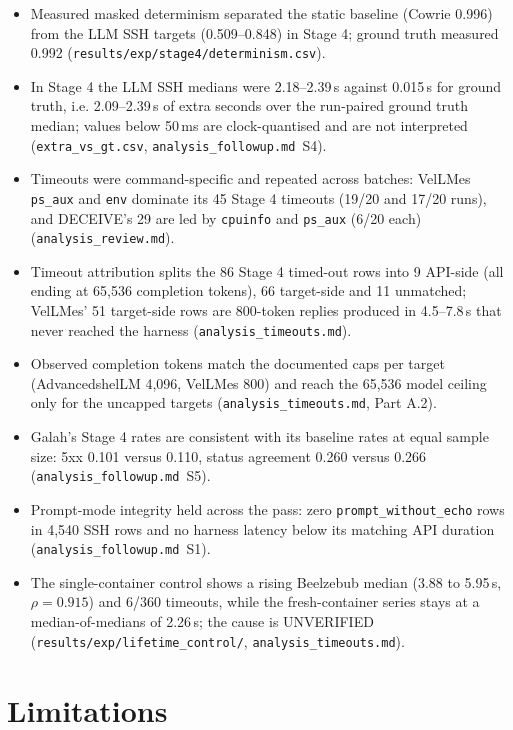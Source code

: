 \documentclass[a4paper,11pt]{article}
\begin{document}
\begin{itemize}[leftmargin=*]
\item Measured masked determinism separated the static baseline (Cowrie 0.996)
  from the LLM SSH targets (0.509--0.848) in Stage 4; ground truth measured
  0.992 (\texttt{results/exp/stage4/determinism.csv}).
\item In Stage 4 the LLM SSH medians were 2.18--2.39\,s against 0.015\,s for
  ground truth, i.e. 2.09--2.39\,s of extra seconds over the run-paired ground
  truth median; values below 50\,ms are clock-quantised and are not
  interpreted (\texttt{extra\_vs\_gt.csv}, \texttt{analysis\_followup.md}~S4).
\item Timeouts were command-specific and repeated across batches: VelLMes
  \texttt{ps\_aux} and \texttt{env} dominate its 45 Stage 4 timeouts (19/20 and
  17/20 runs), and DECEIVE's 29 are led by \texttt{cpuinfo} and \texttt{ps\_aux}
  (6/20 each) (\texttt{analysis\_review.md}).
\item Timeout attribution splits the 86 Stage 4 timed-out rows into 9 API-side
  (all ending at 65,536 completion tokens), 66 target-side and 11 unmatched;
  VelLMes' 51 target-side rows are 800-token replies produced in 4.5--7.8\,s
  that never reached the harness (\texttt{analysis\_timeouts.md}).
\item Observed completion tokens match the documented caps per target
  (AdvancedshelLM 4,096, VelLMes 800) and reach the 65,536 model ceiling only
  for the uncapped targets (\texttt{analysis\_timeouts.md}, Part A.2).
\item Galah's Stage 4 rates are consistent with its baseline rates at equal
  sample size: 5xx 0.101 versus 0.110, status agreement 0.260 versus 0.266
  (\texttt{analysis\_followup.md}~S5).
\item Prompt-mode integrity held across the pass: zero
  \texttt{prompt\_without\_echo} rows in 4,540 SSH rows and no harness latency
  below its matching API duration (\texttt{analysis\_followup.md}~S1).
\item The single-container control shows a rising Beelzebub median
  (3.88 to 5.95\,s, $\rho=0.915$) and 6/360 timeouts, while the fresh-container
  series stays at a median-of-medians of 2.26\,s; the cause is UNVERIFIED
  (\texttt{results/exp/lifetime\_control/}, \texttt{analysis\_timeouts.md}).
\end{itemize}

\section{Limitations}
\end{document}
